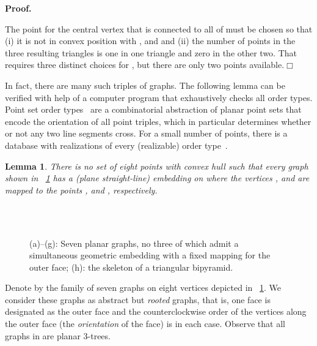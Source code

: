 \documentclass[11pt]{article}
\newtheorem{lemma}[equation]{Lemma}
\newcommand{\qed}{\hfill\ensuremath{\Box}}
\newenvironment{proof}{\noindent\textbf{Proof.}
}{\par\medskip}
\begin{document}
\begin{proof}
  The point  for the central vertex that is connected to all of  must
  be chosen so that (i) it is not in convex position with ,  and 
  and (ii) the number of points in the three resulting triangles is one in one
  triangle and zero in the other two. That requires three distinct choices for
  , but there are only two points available.\qed
\end{proof}
In fact, there are many such triples of graphs. The following lemma can be
verified with help of a computer program that exhaustively checks all order
types. Point set order types~\cite{gp-ms-83} are a combinatorial abstraction of
planar point sets that encode the orientation of all point triples, which in
particular determines whether or not any two line segments cross. For a small
number of points, there is a database with realizations of every (realizable)
order type~\cite{ak-psotd-01}.
\begin{lemma}\label{prop:seven}
  There is no set  of eight points with convex hull 
  such that every graph shown in \figurename~\ref{fig:seven} has a (plane
  straight-line) embedding on  where the vertices ,  and  are mapped
  to the points ,  and , respectively.
\end{lemma}
\begin{figure}[htbp]
  \hfil \subfloat[]{\texttt{[image: 8-7-1]}}\hfil \subfloat[]{\texttt{[image: 8-7-7]}}\hfil \subfloat[]{\texttt{[image: 8-7-4]}}\hfil \subfloat[]{\texttt{[image: 8-7-5]}}\hfil\\
  \hspace*{1pt}\hfil \subfloat[]{\texttt{[image: 8-7-2]}}\hfil \subfloat[]{\texttt{[image: 8-7-6]}}\hfil \subfloat[]{\texttt{[image: 8-7-3]}}\hfil {}\\\caption{\label{fig:seven}{\small (a)--(g)}: Seven planar graphs, no three of
    which admit a simultaneous geometric embedding with a fixed mapping for the
    outer face; {\small (h)}: the skeleton  of a triangular bipyramid.}
\end{figure}
Denote by  the family of seven graphs on eight
vertices depicted in \figurename~\ref{fig:seven}. We consider these graphs as
abstract but \emph{rooted} graphs, that is, one face is designated as the outer
face and the counterclockwise order of the vertices along the outer face (the
\emph{orientation} of the face) is  in each case. Observe that all graphs
in  are planar 3-trees.
\end{document}
